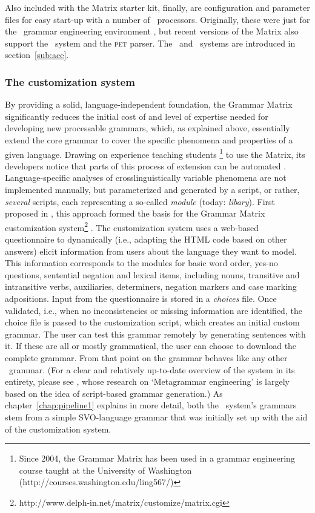 Also included with the Matrix starter kit, finally, are configuration and
parameter files for easy start-up with a number of \delphin\ processors.
Originally, these were just for the \lkb\ grammar engineering environment
\citep{copestake2002implementing}, but recent versions of the Matrix also
support the \ace\ system \citep{sweaglesACE} and the \textsc{pet} parser. The \lkb\ and \ace\ systems are introduced in section~\ref{sub:ace}.

\subsubsection{The customization system}
\label{ssub:matrixcustomization}

By providing a solid, language-independent foundation, the Grammar Matrix
significantly reduces the initial cost of and level of expertise needed for
developing new processable grammars, which, as explained above, essentially
extend the core grammar to cover the specific phenomena and properties of a
given language. Drawing on experience teaching students \footnote{Since 2004,
the Grammar Matrix has been used in a grammar engineering course taught at the
University of Washington (http://courses.washington.edu/ling567/)} to use the
Matrix, its developers notice that parts of this process of extension can be
automated \citep{bender2007combining}. Language-specific analyses of
crosslinguistically variable phenomena are not implemented manually, but
parameterized and generated by a script, or rather, \emph{several} scripts,
each representing a so-called \emph{module} (today: \emph{libary}). First
proposed in \citet{bender2005rapid}, this approach formed the basis for the
Grammar Matrix customization
system\footnote{http://www.delph-in.net/matrix/customize/matrix.cgi}
\citep{bender-EtAl:2010:Demos}. The customization system uses a web-based
questionnaire to dynamically (i.e., adapting the HTML code based on other
answers) elicit information from users about the language they want to model.
This information corresponds to the modules for basic word order, yes-no
questions, sentential negation and lexical items, including nouns, transitive
and intransitive verbs, auxiliaries, determiners, negation markers and case
marking adpositions. Input from the questionnaire is stored in a \emph{choices}
file. Once validated, i.e., when no inconsistencies or missing information are
identified, the choice file is passed to the customization script, which
creates an initial custom grammar. The user can test this grammar remotely by
generating sentences with it. If these are all or mostly grammatical, the user
can choose to download the complete grammar. From that point on the grammar
behaves like any other \delphin\ grammar. (For a clear and relatively
up-to-date overview of the system in its entirety, please see
\citet{fokkens2014enhancing}, whose research on `Metagrammar engineering' is
largely based on the idea of script-based grammar generation.) As
chapter~\ref{chap:pipeline1} explains in more detail, both the \depicto\
system's grammars stem from a simple SVO-language grammar that was initially
set up with the aid of the customization system.

